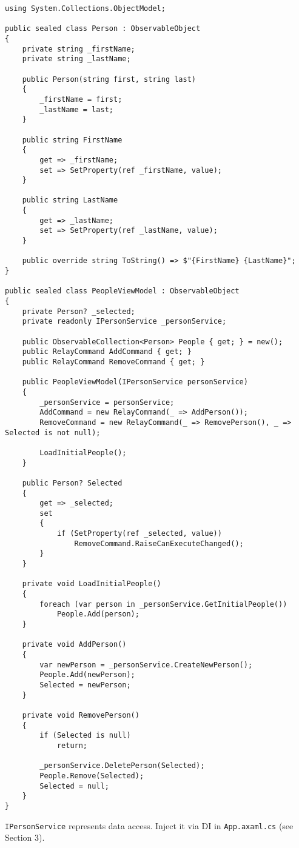 \begin{lstlisting}
using System.Collections.ObjectModel;

public sealed class Person : ObservableObject
{
    private string _firstName;
    private string _lastName;

    public Person(string first, string last)
    {
        _firstName = first;
        _lastName = last;
    }

    public string FirstName
    {
        get => _firstName;
        set => SetProperty(ref _firstName, value);
    }

    public string LastName
    {
        get => _lastName;
        set => SetProperty(ref _lastName, value);
    }

    public override string ToString() => $"{FirstName} {LastName}";
}

public sealed class PeopleViewModel : ObservableObject
{
    private Person? _selected;
    private readonly IPersonService _personService;

    public ObservableCollection<Person> People { get; } = new();
    public RelayCommand AddCommand { get; }
    public RelayCommand RemoveCommand { get; }

    public PeopleViewModel(IPersonService personService)
    {
        _personService = personService;
        AddCommand = new RelayCommand(_ => AddPerson());
        RemoveCommand = new RelayCommand(_ => RemovePerson(), _ => Selected is not null);

        LoadInitialPeople();
    }

    public Person? Selected
    {
        get => _selected;
        set
        {
            if (SetProperty(ref _selected, value))
                RemoveCommand.RaiseCanExecuteChanged();
        }
    }

    private void LoadInitialPeople()
    {
        foreach (var person in _personService.GetInitialPeople())
            People.Add(person);
    }

    private void AddPerson()
    {
        var newPerson = _personService.CreateNewPerson();
        People.Add(newPerson);
        Selected = newPerson;
    }

    private void RemovePerson()
    {
        if (Selected is null)
            return;

        _personService.DeletePerson(Selected);
        People.Remove(Selected);
        Selected = null;
    }
}
\end{lstlisting}

\passthrough{\lstinline!IPersonService!} represents data access. Inject
it via DI in \passthrough{\lstinline!App.axaml.cs!} (see Section 3).

